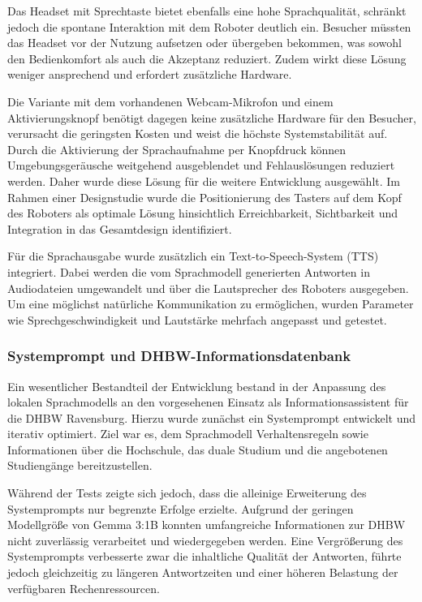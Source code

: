 Das Headset mit Sprechtaste bietet ebenfalls eine hohe Sprachqualität, schränkt jedoch die spontane Interaktion mit dem Roboter deutlich ein. Besucher müssten das Headset vor der Nutzung aufsetzen oder übergeben bekommen, was sowohl den Bedienkomfort als auch die Akzeptanz reduziert. Zudem wirkt diese Lösung weniger ansprechend und erfordert zusätzliche Hardware.

Die Variante mit dem vorhandenen Webcam-Mikrofon und einem Aktivierungsknopf benötigt dagegen keine zusätzliche Hardware für den Besucher, verursacht die geringsten Kosten und weist die höchste Systemstabilität auf. Durch die Aktivierung der Sprachaufnahme per Knopfdruck können Umgebungsgeräusche weitgehend ausgeblendet und Fehlauslösungen reduziert werden. Daher wurde diese Lösung für die weitere Entwicklung ausgewählt. Im Rahmen einer Designstudie wurde die Positionierung des Tasters auf dem Kopf des Roboters als optimale Lösung hinsichtlich Erreichbarkeit, Sichtbarkeit und Integration in das Gesamtdesign identifiziert.

Für die Sprachausgabe wurde zusätzlich ein Text-to-Speech-System (TTS) integriert. Dabei werden die vom Sprachmodell generierten Antworten in Audiodateien umgewandelt und über die Lautsprecher des Roboters ausgegeben. Um eine möglichst natürliche Kommunikation zu ermöglichen, wurden Parameter wie Sprechgeschwindigkeit und Lautstärke mehrfach angepasst und getestet.

\subsubsection*{Systemprompt und DHBW-Informationsdatenbank}

Ein wesentlicher Bestandteil der Entwicklung bestand in der Anpassung des lokalen Sprachmodells an den vorgesehenen Einsatz als Informationsassistent für die DHBW Ravensburg. Hierzu wurde zunächst ein Systemprompt entwickelt und iterativ optimiert. Ziel war es, dem Sprachmodell Verhaltensregeln sowie Informationen über die Hochschule, das duale Studium und die angebotenen Studiengänge bereitzustellen.

Während der Tests zeigte sich jedoch, dass die alleinige Erweiterung des Systemprompts nur begrenzte Erfolge erzielte. Aufgrund der geringen Modellgröße von Gemma 3:1B konnten umfangreiche Informationen zur DHBW nicht zuverlässig verarbeitet und wiedergegeben werden. Eine Vergrößerung des Systemprompts verbesserte zwar die inhaltliche Qualität der Antworten, führte jedoch gleichzeitig zu längeren Antwortzeiten und einer höheren Belastung der verfügbaren Rechenressourcen.

